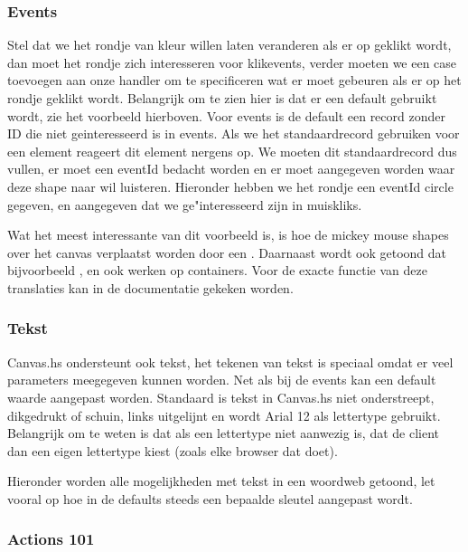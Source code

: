\subsubsection{Events}
Stel dat we het rondje van kleur willen laten veranderen als er op geklikt wordt, dan moet het rondje zich interesseren voor klikevents, verder moeten we een case toevoegen aan onze handler om te specificeren wat er moet gebeuren als er op het rondje geklikt wordt. Belangrijk om te zien hier is dat er een default gebruikt wordt, zie het voorbeeld hierboven. Voor events is de default een record zonder ID die niet geinteresseerd is in events. Als we het standaardrecord gebruiken voor een element reageert dit element nergens op. We moeten dit standaardrecord dus vullen, er moet een eventId bedacht worden en er moet aangegeven worden waar deze shape naar wil luisteren. Hieronder hebben we het rondje een eventId circle gegeven, en aangegeven dat we ge"interesseerd zijn in muiskliks.



Wat het meest interessante van dit voorbeeld is, is hoe de mickey mouse shapes over het canvas verplaatst worden door een . Daarnaast wordt ook getoond dat bijvoorbeeld ,  en  ook werken op containers. Voor de exacte functie van deze translaties kan in de documentatie gekeken worden. 

\subsubsection{Tekst}

Canvas.hs ondersteunt ook tekst, het tekenen van tekst is speciaal omdat er veel parameters meegegeven kunnen worden. Net als bij de events kan een default waarde aangepast worden. Standaard is tekst in Canvas.hs niet onderstreept, dikgedrukt of schuin, links uitgelijnt en wordt Arial 12 als lettertype gebruikt. Belangrijk om te weten is dat als een lettertype niet aanwezig is, dat de client dan een eigen lettertype kiest (zoals elke browser dat doet).

Hieronder worden alle mogelijkheden met tekst in een woordweb getoond, let vooral op hoe in de defaults steeds een bepaalde sleutel aangepast wordt.


\subsubsection{Actions 101}

